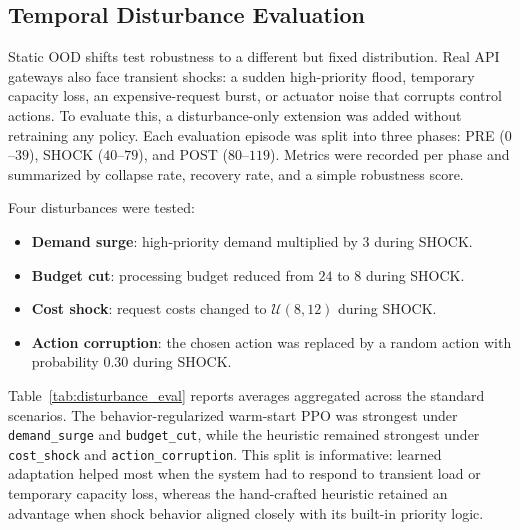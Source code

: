 \documentclass[conference]{IEEEtran}
\begin{document}
\subsection{Temporal Disturbance Evaluation}
Static OOD shifts test robustness to a different but fixed distribution. Real API gateways also face transient shocks: a sudden high-priority flood, temporary capacity loss, an expensive-request burst, or actuator noise that corrupts control actions. To evaluate this, a disturbance-only extension was added without retraining any policy. Each evaluation episode was split into three phases: PRE ($0$--$39$), SHOCK ($40$--$79$), and POST ($80$--$119$). Metrics were recorded per phase and summarized by collapse rate, recovery rate, and a simple robustness score.

Four disturbances were tested:
\begin{itemize}[leftmargin=1.5em]
    \item \textbf{Demand surge}: high-priority demand multiplied by $3$ during SHOCK.
    \item \textbf{Budget cut}: processing budget reduced from $24$ to $8$ during SHOCK.
    \item \textbf{Cost shock}: request costs changed to $\mathcal{U}(8,12)$ during SHOCK.
    \item \textbf{Action corruption}: the chosen action was replaced by a random action with probability $0.30$ during SHOCK.
\end{itemize}

Table~\ref{tab:disturbance_eval} reports averages aggregated across the standard scenarios. The behavior-regularized warm-start PPO was strongest under \texttt{demand\_surge} and \texttt{budget\_cut}, while the heuristic remained strongest under \texttt{cost\_shock} and \texttt{action\_corruption}. This split is informative: learned adaptation helped most when the system had to respond to transient load or temporary capacity loss, whereas the hand-crafted heuristic retained an advantage when shock behavior aligned closely with its built-in priority logic.
\end{document}
